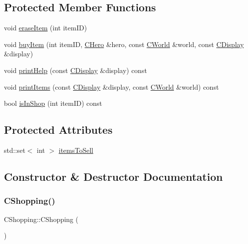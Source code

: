\subsection*{Protected Member Functions}
\begin{DoxyCompactItemize}
\item 
void \mbox{\hyperlink{class_c_shopping_a83cfae0f7001775fc1d5a5dc097b3e96}{erase\+Item}} (int item\+ID)
\item 
void \mbox{\hyperlink{class_c_shopping_a0981a7916cca8a37beb35858ad2ec77e}{buy\+Item}} (int item\+ID, \mbox{\hyperlink{class_c_hero}{C\+Hero}} \&hero, const \mbox{\hyperlink{class_c_world}{C\+World}} \&world, const \mbox{\hyperlink{class_c_display}{C\+Display}} \&display)
\item 
void \mbox{\hyperlink{class_c_shopping_a5d075417297809f43042d74da0fdaad5}{print\+Help}} (const \mbox{\hyperlink{class_c_display}{C\+Display}} \&display) const
\item 
void \mbox{\hyperlink{class_c_shopping_acfb04014dcfe9b4ddca2206a567112c9}{print\+Items}} (const \mbox{\hyperlink{class_c_display}{C\+Display}} \&display, const \mbox{\hyperlink{class_c_world}{C\+World}} \&world) const
\item 
bool \mbox{\hyperlink{class_c_shopping_af06bd6ee3beb6ab523a4b7291a677201}{is\+In\+Shop}} (int item\+ID) const
\end{DoxyCompactItemize}
\subsection*{Protected Attributes}
\begin{DoxyCompactItemize}
\item 
std\+::set$<$ int $>$ \mbox{\hyperlink{class_c_shopping_ac6f61d541ae75665fd5a6e2d360a0bfd}{items\+To\+Sell}}
\end{DoxyCompactItemize}


\subsection{Constructor \& Destructor Documentation}
\mbox{\label{class_c_shopping_a3d9bc582b9961e02efc9dc22c6da2ced}} 
\subsubsection{\texorpdfstring{C\+Shopping()}{CShopping()}}
{\footnotesize\ttfamily C\+Shopping\+::\+C\+Shopping (\begin{DoxyParamCaption}{ }\end{DoxyParamCaption})\hspace{0.3cm}{\ttfamily [default]}}



